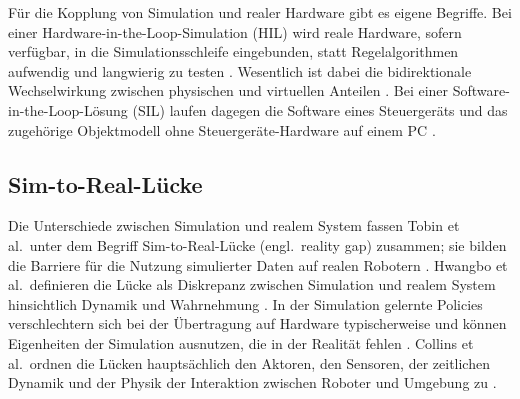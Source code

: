 Für die Kopplung von Simulation und realer Hardware gibt es eigene Begriffe.
Bei einer Hardware-in-the-Loop-Simulation (HIL) wird reale Hardware, sofern verfügbar, in die Simulationsschleife eingebunden, statt Regelalgorithmen aufwendig und langwierig zu testen \cite{Mihalic2022}.
Wesentlich ist dabei die bidirektionale Wechselwirkung zwischen physischen und virtuellen Anteilen \cite{Mihalic2022}.
Bei einer Software-in-the-Loop-Lösung (SIL) laufen dagegen die Software eines Steuergeräts und das zugehörige Objektmodell ohne Steuergeräte-Hardware auf einem PC \cite{Mihalic2022}.

\subsection{Sim-to-Real-Lücke}
\label{sec:sim2real}
Die Unterschiede zwischen Simulation und realem System fassen Tobin et al.\ unter dem Begriff Sim-to-Real-Lücke (engl.\ reality gap) zusammen; sie bilden die Barriere für die Nutzung simulierter Daten auf realen Robotern \cite{Tobin2017}.
Hwangbo et al.\ definieren die Lücke als Diskrepanz zwischen Simulation und realem System hinsichtlich Dynamik und Wahrnehmung \cite{Hwangbo2019}.
In der Simulation gelernte Policies verschlechtern sich bei der Übertragung auf Hardware typischerweise \cite{Collins2021} und können Eigenheiten der Simulation ausnutzen, die in der Realität fehlen \cite{Ha2025}.
Collins et al.\ ordnen die Lücken hauptsächlich den Aktoren, den Sensoren, der zeitlichen Dynamik und der Physik der Interaktion zwischen Roboter und Umgebung zu \cite{Collins2019}.

